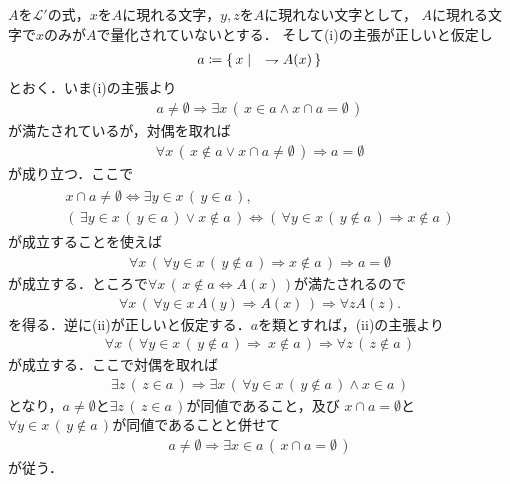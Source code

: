 	\begin{prf}
		$A$を$\mathcal{L}'$の式，$x$を$A$に現れる文字，$y,z$を$A$に現れない文字として，
		$A$に現れる文字で$x$のみが$A$で量化されていないとする．
		そして(i)の主張が正しいと仮定し
		\begin{align}
			a \coloneqq \left\{\, x \mid \quad \rightharpoondown A(x)\, \right\}
		\end{align}
		とおく．いま(i)の主張より
		\begin{align}
			a \neq \emptyset \Longrightarrow 
			\exists x\, (\, x \in a \wedge x \cap a = \emptyset\, )
		\end{align}
		が満たされているが，対偶を取れば
		\begin{align}
			\forall x\, (\, x \notin a \vee x \cap a \neq \emptyset\, )
			\Longrightarrow a = \emptyset
		\end{align}
		が成り立つ．ここで
		\begin{align}
			\begin{gathered}
				x \cap a \neq \emptyset \Longleftrightarrow \exists y \in x\, (\, y \in a\, ), \\
				\left(\, \exists y \in x\, (\, y \in a\, ) \vee x \notin a\, \right)
				\Longleftrightarrow \left(\, \forall y \in x\, (\, y \notin a\, ) \Longrightarrow x \notin a\, \right)
			\end{gathered}
		\end{align}
		が成立することを使えば
		\begin{align}
			\forall x\, (\, \forall y \in x\, (\, y \notin a\, ) \Longrightarrow x \notin a\, )
			\Longrightarrow a = \emptyset
		\end{align}
		が成立する．ところで$\forall x\, (\, x \notin a \Longleftrightarrow A(x)\, )$が満たされるので
		\begin{align}
			\forall x\, \left(\, \forall y \in x\, A(y)
			\Longrightarrow A(x)\, \right)
			\Longrightarrow \forall z A(z).
		\end{align}
		を得る．逆に(ii)が正しいと仮定する．$a$を類とすれば，(ii)の主張より
		\begin{align}
			\forall x\, \left(\, \forall y \in x\, (\, y \notin a\, )
			\Longrightarrow\ x \notin a\, \right)
			\Longrightarrow \forall z\, (\, z \notin a\, )
		\end{align}
		が成立する．ここで対偶を取れば
		\begin{align}
			\exists z\, (\, z \in a\, ) \Longrightarrow 
			\exists x\, \left(\, \forall y \in x\, (\, y \notin a\, ) \wedge x \in a\, \right)
		\end{align}
		となり，$a \neq \emptyset$と$\exists z\, (\, z \in a\, )$が同値であること，及び
		$x \cap a = \emptyset$と$\forall y \in x\, (\, y \notin a\, )$が同値であることと併せて
		\begin{align}
			a \neq \emptyset \Longrightarrow 
			\exists x \in a\, (\, x \cap a = \emptyset\, )
		\end{align}
		が従う．
		\QED
	\end{prf}
	
